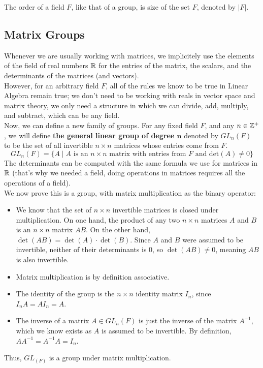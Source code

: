 \documentclass[12pt]{article}
\begin{document}
    The order of a field $F$, like that of a group,
    is size of the set $F$, denoted by $|F|$. \\

    \subsection*{Matrix Groups}

    Whenever we are usually working with matrices,
    we implicitely use the elements of the field of real numbers $\mathbb{R}$
    for the entries of the matrix,
    the scalars,
    and the determinants of the matrices (and vectors). \\
    However, for an arbitrary field $F$,
    all of the rules we know to be true in Linear Algebra remain true;
    we don't need to be working with reals
    in vector space and matrix theory,
    we only need a structure in which we can
    divide, add, multiply, and subtract,
    which can be any field. \\

    Now, we can define a new family of groups.
    For any fixed field $F$,
    and any $n \in \mathbb{Z}^+$,
    we will define
    \textbf{the general linear group of degree $\boldsymbol{n}$}
    denoted by $GL_n(F)$
    to be the set of all invertible $n \times n$ matrices
    whose entries come from $F$.
    \[ GL_n(F) = \{ A \mid A
    \text{ is an $n \times n$ matrix
    with entries from $F$ and det$(A) \neq 0$} \} \]
    The determinants can be computed with the same formula
    we use for matrices in $\mathbb{R}$
    (that's why we needed a field, doing operations in matrices
    requires all the operations of a field). \\

    We now prove this is a group, with matrix multiplication
    as the binary operator:
    \begin{itemize}[label=$\diamond$]
        \item 
            We know that the set of $n \times n$ invertible matrices
            is closed under multiplication.
            On one hand, the product of any two $n \times n$ matrices
            $A$ and $B$ is an $n \times n$ matrix $AB$.
            On the other hand, $\det(AB) = \det(A) \cdot \det(B)$.
            Since $A$ and $B$ were assumed to be invertible,
            neither of their determinants is $0$,
            so $\det(AB) \neq 0$,
            meaning $AB$ is also invertible. 
        \item 
            Matrix multiplication is by definition associative.
        \item 
            The identity of the group
            is the $n \times n$ identity matrix $I_n$,
            since $I_nA = AI_n = A$.
        \item 
            The inverse of a matrix $A \in GL_n(F)$
            is just the inverse of the matrix $A^{-1}$,
            which we know exists as $A$ is assumed to be invertible.
            By definition,
            $AA^{-1} = A^{-1}A = I_n$.
    \end{itemize}
    Thus, $GL_(F)$ is a group under matrix multiplication. \\
\end{document}
